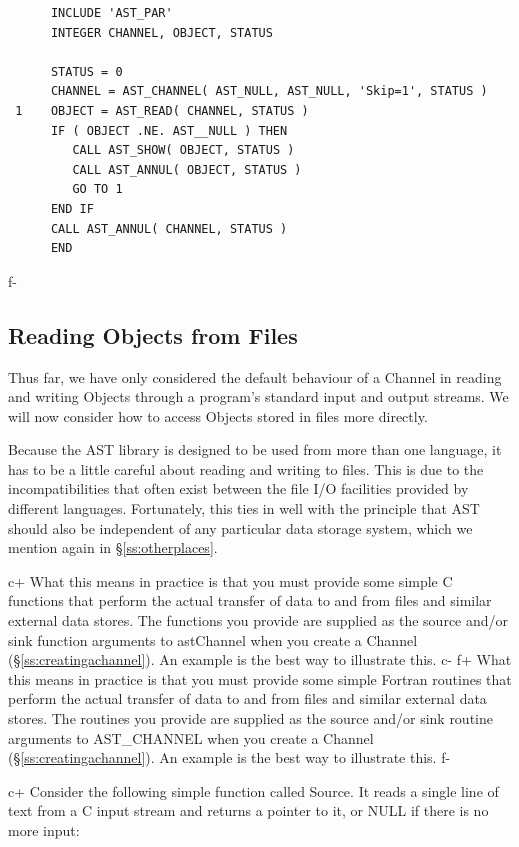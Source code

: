\documentclass[twoside,11pt]{article}
\newcommand{\secref}[1]{\S\ref{#1}}
\newcommand{\secref}[1]{\ref{#1}}
\begin{document}
\small
\begin{verbatim}
      INCLUDE 'AST_PAR'
      INTEGER CHANNEL, OBJECT, STATUS

      STATUS = 0      
      CHANNEL = AST_CHANNEL( AST_NULL, AST_NULL, 'Skip=1', STATUS )
 1    OBJECT = AST_READ( CHANNEL, STATUS )
      IF ( OBJECT .NE. AST__NULL ) THEN
         CALL AST_SHOW( OBJECT, STATUS )
         CALL AST_ANNUL( OBJECT, STATUS )
         GO TO 1
      END IF
      CALL AST_ANNUL( CHANNEL, STATUS )
      END
\end{verbatim}
\normalsize
f-

\subsection{\label{ss:channelsource}Reading Objects from Files}

Thus far, we have only considered the default behaviour of a Channel
in reading and writing Objects through a program's standard input and
output streams. We will now consider how to access Objects stored in
files more directly.

Because the AST library is designed to be used from more than one
language, it has to be a little careful about reading and writing to
files. This is due to the incompatibilities that often exist between
the file I/O facilities provided by different languages.  Fortunately,
this ties in well with the principle that AST should also be
independent of any particular data storage system, which we mention
again in \secref{ss:otherplaces}.

c+
What this means in practice is that you must provide some simple C
functions that perform the actual transfer of data to and from files
and similar external data stores. The functions you provide are
supplied as the source and/or sink function arguments to astChannel
when you create a Channel (\secref{ss:creatingachannel}). An example is
the best way to illustrate this.
c-
f+
What this means in practice is that you must provide some simple
Fortran routines that perform the actual transfer of data to and from
files and similar external data stores. The routines you provide are
supplied as the source and/or sink routine arguments to AST\_CHANNEL
when you create a Channel (\secref{ss:creatingachannel}). An example is
the best way to illustrate this.
f-

c+
Consider the following simple function called Source. It reads a
single line of text from a C input stream and returns a pointer to it,
or NULL if there is no more input:
\end{document}

